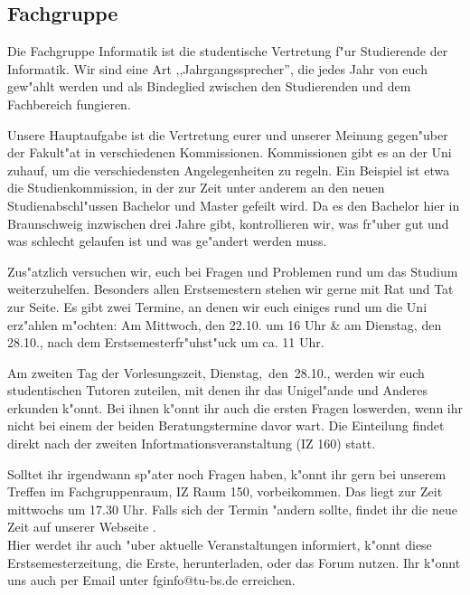 \subsection{Fachgruppe}

Die Fachgruppe Informatik ist die studentische Vertretung f"ur Studierende der Informatik.
Wir sind eine Art ,,Jahrgangssprecher'', die jedes Jahr von euch gew"ahlt werden und als Bindeglied zwischen den Studierenden und dem Fachbereich fungieren.

Unsere Hauptaufgabe ist die Vertretung eurer und unserer Meinung gegen"uber der
Fakult"at in verschiedenen Kommissionen. Kommissionen gibt es an der Uni zuhauf, um die verschiedensten Angelegenheiten zu regeln. Ein Beispiel ist etwa die Studienkommission, in der zur Zeit unter anderem an den neuen Studienabschl"ussen Bachelor und Master gefeilt wird. Da es den Bachelor hier in Braunschweig inzwischen drei Jahre gibt, kontrollieren wir, was fr"uher gut und was schlecht gelaufen ist und was ge"andert werden muss.

Zus"atzlich versuchen wir, euch bei Fragen und Problemen rund um das Studium weiterzuhelfen. Besonders allen Erstsemestern stehen wir gerne mit Rat und Tat zur Seite. Es gibt zwei Termine, an denen wir euch einiges rund um die Uni erz"ahlen m"ochten: Am Mittwoch, den 22.10. um 16 Uhr \& am Dienstag, den 28.10., nach dem Erstsemesterfr"uhst"uck um ca. 11 Uhr. \par
Am zweiten Tag der Vorlesungszeit, \mbox{Dienstag, den 28.10.}, werden wir euch studentischen Tutoren zuteilen, mit denen ihr das Unigel"ande und Anderes erkunden k"onnt. Bei ihnen k"onnt ihr auch die ersten Fragen loswerden, wenn ihr nicht bei einem der beiden Beratungstermine davor wart. Die Einteilung findet direkt nach der zweiten Infortmationsveranstaltung (IZ 160) statt.

Solltet ihr irgendwann sp"ater noch Fragen haben, k"onnt ihr gern bei unserem Treffen im Fachgruppenraum, IZ Raum 150, vorbeikommen. Das liegt zur Zeit mittwochs um 17.30 Uhr. 
Falls sich der Termin "andern sollte, findet ihr die neue Zeit auf unserer Webseite \mbox{}. \\
Hier werdet ihr auch "uber aktuelle Veranstaltungen informiert, k"onnt diese Erstsemesterzeitung, die Erste, herunterladen, oder das Forum nutzen.
Ihr k"onnt uns auch per Email unter fginfo@tu-bs.de erreichen.
